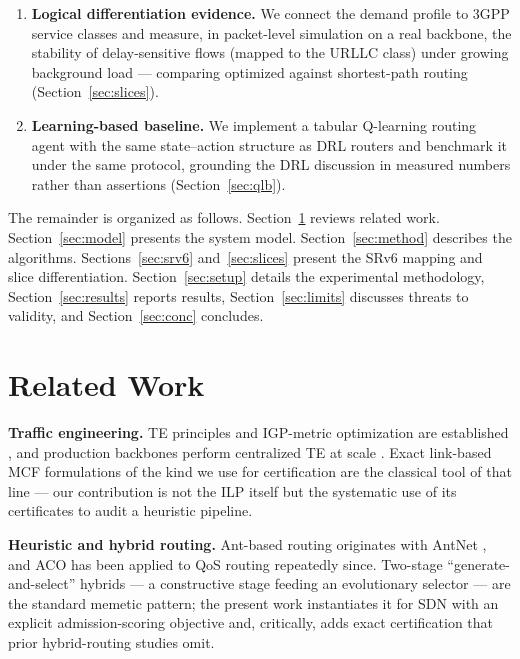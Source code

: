 \documentclass[journal]{IEEEtran}
\begin{document}
\begin{enumerate}
per-flow forwarding state on all instances, quantifying the reduction with
respect to per-flow OpenFlow rules and bounding the SRH overhead
(Section~\ref{sec:srv6}).
\item \textbf{Logical differentiation evidence.} We connect the demand
profile to 3GPP service classes \cite{itu-m2083,3gpp-ts23501} and measure, in
packet-level simulation on a real backbone, the stability of delay-sensitive
flows (mapped to the URLLC class) under growing background load ---
comparing optimized against shortest-path routing (Section~\ref{sec:slices}).
\item \textbf{Learning-based baseline.} We implement a tabular Q-learning
routing agent with the same state--action structure as DRL routers and
benchmark it under the same protocol, grounding the DRL discussion in
measured numbers rather than assertions (Section~\ref{sec:qlb}).
\end{enumerate}

The remainder is organized as follows.
Section~\ref{sec:related} reviews related work.
Section~\ref{sec:model} presents the system model.
Section~\ref{sec:method} describes the algorithms.
Sections~\ref{sec:srv6} and~\ref{sec:slices} present the SRv6 mapping and
slice differentiation.
Section~\ref{sec:setup} details the experimental methodology,
Section~\ref{sec:results} reports results, Section~\ref{sec:limits} discusses
threats to validity, and Section~\ref{sec:conc} concludes.

\section{Related Work}
\label{sec:related}
\textbf{Traffic engineering.} TE principles and IGP-metric optimization are
established \cite{awduche2002,fortz2000}, and production backbones perform
centralized TE at scale \cite{jain2013}. Exact link-based MCF formulations
of the kind we use for certification are the classical tool of that line ---
our contribution is not the ILP itself but the systematic use of its
certificates to audit a heuristic pipeline.

\textbf{Heuristic and hybrid routing.} Ant-based routing originates with
AntNet \cite{dicaro1998,dorigo2004}, and ACO has been applied to QoS routing
repeatedly since. Two-stage ``generate-and-select'' hybrids --- a constructive
stage feeding an evolutionary selector --- are the standard memetic pattern;
the present work instantiates it for SDN with an explicit admission-scoring
objective and, critically, adds exact certification that prior hybrid-routing
studies omit.
\end{document}
